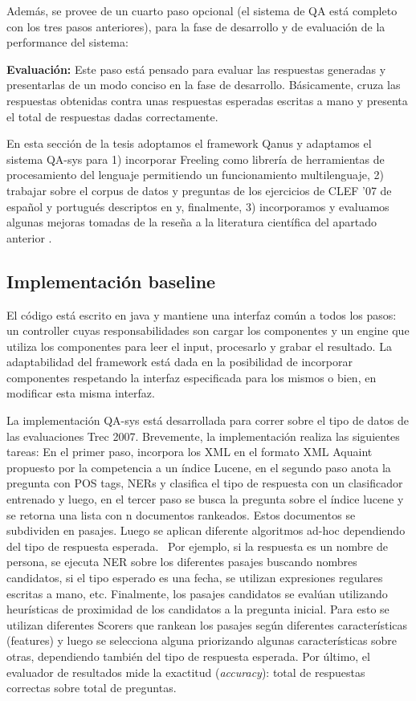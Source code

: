 Además, se provee de un cuarto paso opcional (el sistema de QA está
completo con los tres pasos anteriores), para la fase de desarrollo y
de evaluación de la performance del sistema:\newline


\textbf{Evaluación: }Este paso está pensado para evaluar las respuestas generadas y
presentarlas de un modo conciso en la fase de desarrollo.
Básicamente, cruza las respuestas obtenidas contra unas respuestas
esperadas escritas a mano y presenta el total de respuestas dadas
correctamente.\newline

En esta sección de la tesis adoptamos el framework Qanus y adaptamos el sistema QA-sys para 1) incorporar Freeling como librería de herramientas de procesamiento del lenguaje permitiendo un funcionamiento multilenguaje, 2) trabajar sobre el corpus de datos y preguntas de los ejercicios de CLEF '07 de español y portugués descriptos en  y, finalmente, 3) incorporamos y evaluamos algunas mejoras tomadas de la reseña a la literatura científica del apartado anterior .

\subsection{Implementación baseline}
\label{subsec:baseline}
El código está escrito en java y mantiene una interfaz común a
todos los pasos: un controller cuyas responsabilidades son cargar los
componentes y un engine que utiliza los componentes para leer el input,
procesarlo y grabar el resultado. La adaptabilidad del framework está
dada en la posibilidad de incorporar componentes respetando la interfaz
especificada para los mismos o bien, en modificar esta misma interfaz.

La implementación QA-sys está desarrollada para correr sobre
el tipo de datos de las evaluaciones Trec 2007.
Brevemente, la implementación realiza las siguientes tareas:
En el primer paso, incorpora los XML en el formato XML Aquaint propuesto por la competencia a un índice Lucene, en
el segundo paso anota la pregunta con POS tags, NERs y
clasifica el tipo de respuesta con un clasificador entrenado y luego,
en el tercer paso se busca la pregunta sobre el índice lucene y se
retorna una lista con n documentos rankeados. Estos documentos se
subdividen en pasajes. Luego se aplican diferente algoritmos ad-hoc
dependiendo del tipo de respuesta esperada. \ Por ejemplo, si la
respuesta es un nombre de persona, se ejecuta NER sobre los diferentes
pasajes buscando nombres candidatos, si el tipo esperado es una fecha,
se utilizan expresiones regulares escritas a mano, etc. Finalmente, los
pasajes candidatos se evalúan utilizando heurísticas de proximidad
de los candidatos a la pregunta inicial. Para esto se utilizan
diferentes Scorers que rankean los pasajes según diferentes
características (features) y luego se selecciona alguna priorizando
algunas características sobre otras, dependiendo también del tipo
de respuesta esperada. Por último, el evaluador de resultados mide la
exactitud (\textit{accuracy}): total de respuestas correctas sobre
total de preguntas.


